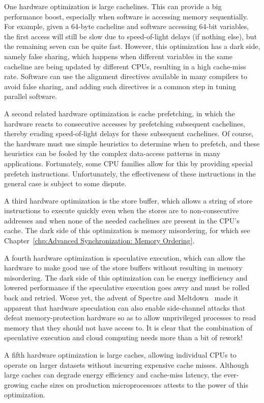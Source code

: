 One hardware optimization is large cachelines.
This can provide a big performance boost, especially when software is
accessing memory sequentially.
For example, given a 64-byte cacheline and software accessing 64-bit
variables, the first access will still be slow due to speed-of-light
delays (if nothing else), but the remaining seven can be quite fast.
However, this optimization has a dark side, namely false sharing,
which happens when different variables in the same cacheline are
being updated by different CPUs, resulting in a high cache-miss rate.
Software can use the alignment directives available in many compilers
to avoid false sharing, and adding such directives is a common step
in tuning parallel software.

A second related hardware optimization is cache prefetching, in which
the hardware reacts to consecutive accesses by prefetching subsequent
cachelines, thereby evading speed-of-light delays for these
subsequent cachelines.
Of course, the hardware must use simple heuristics to determine when
to prefetch, and these heuristics can be fooled by the complex data-access
patterns in many applications.
Fortunately, some CPU families allow for this by providing special
prefetch instructions.
Unfortunately, the effectiveness of these instructions in the general
case is subject to some dispute.

A third hardware optimization is the store buffer, which allows a string
of store instructions to execute quickly even when the stores are to
non-consecutive addresses and when none of the needed cachelines are
present in the CPU's cache.
The dark side of this optimization is memory misordering, for which see
Chapter~\ref{chp:Advanced Synchronization: Memory Ordering}.

A fourth hardware optimization is speculative execution, which can
allow the hardware to make good use of the store buffers without
resulting in memory misordering.
The dark side of this optimization can be energy inefficiency and
lowered performance if the speculative execution goes awry and must
be rolled back and retried.
Worse yet, the advent of
Spectre and Meltdown~\cite{JannHorn2018MeltdownSpectre}
made it apparent that hardware speculation can also enable side-channel
attacks that defeat memory-protection hardware so as to allow unprivileged
processes to read memory that they should not have access to.
It is clear that the combination of speculative execution and cloud
computing needs more than a bit of rework!

A fifth hardware optimization is large caches, allowing individual
CPUs to operate on larger datasets without incurring expensive cache
misses.
Although large caches can degrade energy efficiency and cache-miss
latency, the ever-growing cache sizes on production microprocessors
attests to the power of this optimization.

